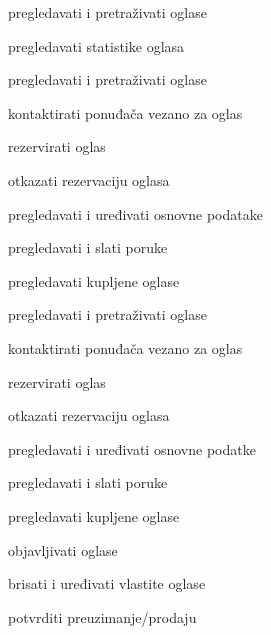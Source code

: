 		
		\begin{packed_enum}
			\item  {}
			
			\begin{packed_enum}
				
				\item pregledavati i pretraživati oglase
				\item pregledavati statistike oglasa
				
			\end{packed_enum}
			
			\item  {}
			
			\begin{packed_enum}
				
				\item pregledavati i pretraživati oglase
				\item kontaktirati ponuđača vezano za oglas
				\item rezervirati oglas
				\item otkazati rezervaciju oglasa
				\item pregledavati i uređivati osnovne podatake
				\item pregledavati i slati poruke
				\item pregledavati kupljene oglase
				
			\end{packed_enum}
			
			\item {}
			
			\begin{packed_enum}
				\item pregledavati i pretraživati oglase 
				\item kontaktirati ponuđača vezano za oglas
				\item rezervirati oglas
				\item otkazati rezervaciju oglasa
				\item pregledavati i uređivati osnovne podatke
				\item pregledavati i slati poruke
				\item pregledavati kupljene oglase
				\item objavljivati oglase
				\item brisati i uređivati vlastite oglase
				\item potvrditi preuzimanje/prodaju
				

\end{packed_enum}
\end{packed_enum}

